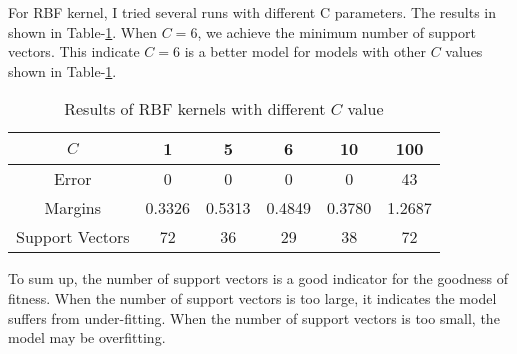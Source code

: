 \documentclass[12pt]{article}
\begin{document}
For RBF kernel, I tried several runs with different C parameters. The results in shown in Table-\ref{tab:rbf}. When $C=6$, we achieve the minimum number of support vectors. This indicate $C=6$ is a better model for models with other $C$ values shown in Table-\ref{tab:rbf}. \\

\begin{table}[ht!]
  \begin{center}
    \begin{tabular}{|c|c|c|c|c|c|}
      \hline
      $C$	  &    1   &   5    &    6   &   10   &  100   \\ \hline
      Error       &    0   &   0    &    0   &    0   &   43   \\ \hline
      Margins     & 0.3326 & 0.5313 & 0.4849 & 0.3780 & 1.2687 \\ \hline
      Support Vectors & 72 &  36    &   29   &   38   &   72   \\ \hline
    \end{tabular}
  \end{center}
  \caption{Results of RBF kernels with different $C$ value 
    \label{tab:rbf}}
\end{table}

To sum up, the number of support vectors is a good indicator for the goodness of fitness. When the number of support vectors is too large, it indicates the model suffers from under-fitting. When the number of support vectors is too small, the model may be overfitting.
\end{document}

